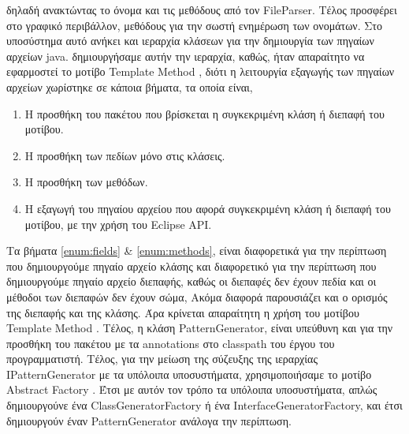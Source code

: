 δηλαδή ανακτώντας το όνομα και τις μεθόδους από τον FileParser. Τέλος προσφέρει στο γραφικό περιβάλλον, μεθόδους για την σωστή ενημέρωση των ονομάτων.
\newline \newline
Στο υποσύστημα αυτό ανήκει και ιεραρχία κλάσεων για την δημιουργία των πηγαίων αρχείων java. δημιουργήσαμε αυτήν την ιεραρχία, καθώς,
ήταν απαραίτητο να εφαρμοστεί το μοτίβο Template Method \cite{GoF}, διότι η λειτουργία εξαγωγής των πηγαίων αρχείων χωρίστηκε σε κάποια βήματα, τα οποία είναι,
\begin{enumerate}
    \item Η προσθήκη του πακέτου που βρίσκεται η συγκεκριμένη κλάση ή διεπαφή του μοτίβου.
    \item Η προσθήκη των πεδίων μόνο στις κλάσεις. \label{enum:fields}
    \item Η προσθήκη των μεθόδων. \label{enum:methods}
    \item Η εξαγωγή του πηγαίου αρχείου που αφορά συγκεκριμένη κλάση ή διεπαφή του μοτίβου, με την χρήση του Eclipse API.
\end{enumerate}
Τα βήματα \ref{enum:fields} \& \ref{enum:methods}, είναι διαφορετικά για την περίπτωση που δημιουργούμε πηγαίο αρχείο κλάσης 
και διαφορετικό για την περίπτωση που δημιουργούμε πηγαίο αρχείο διεπαφής, καθώς οι διεπαφές δεν έχουν πεδία 
και οι μέθοδοι των διεπαφών δεν έχουν σώμα, Ακόμα διαφορά παρουσιάζει και ο ορισμός της διεπαφής και της κλάσης. 
Άρα κρίνεται απαραίτητη η χρήση του μοτίβου Template Method \cite{GoF}. Τέλος, η κλάση PatternGenerator, 
είναι υπεύθυνη και για την προσθήκη του πακέτου με τα annotations στο classpath του έργου του προγραμματιστή.
\newline \newline
Τέλος, για την μείωση της σύζευξης της ιεραρχίας IPatternGenerator με τα υπόλοιπα υποσυστήματα, 
χρησιμοποιήσαμε το μοτίβο Abstract Factory \cite{GoF}. Έτσι με αυτόν τον τρόπο τα υπόλοιπα υποσυστήματα, 
απλώς δημιουργούνε ένα \mbox{ClassGeneratorFactory} ή ένα \mbox{InterfaceGeneratorFactory}, 
και έτσι δημιουργούν έναν PatternGenerator ανάλογα την περίπτωση.
